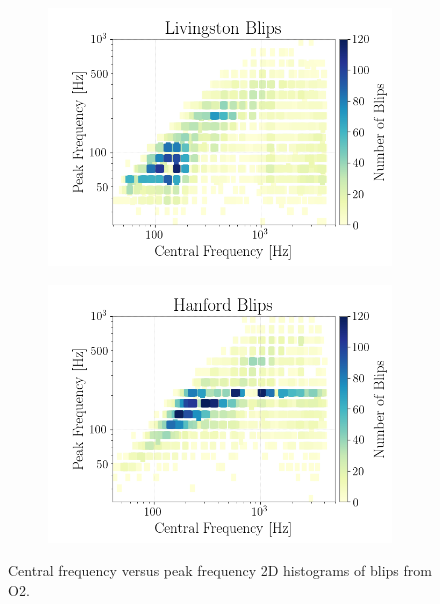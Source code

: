 \documentclass[a4paper]{article}
\begin{document}
\begin{figure}[h!]
	\centering
	\begin{subfigure}{.49\textwidth}
		\centering
		\includegraphics[width=1\linewidth]{llo_peak_v_centr}
		\label{fig:llo_centr}
	\end{subfigure}
	\begin{subfigure}{.49\textwidth}
		\centering
		\includegraphics[width=1\linewidth]{lho_peak_v_centr}
		\label{fig:lho_centr}
	\end{subfigure}
	\caption{Central frequency versus peak frequency 2D histograms of blips from O2.}
	\label{fig:central_hists}
\end{figure}
\end{document}
